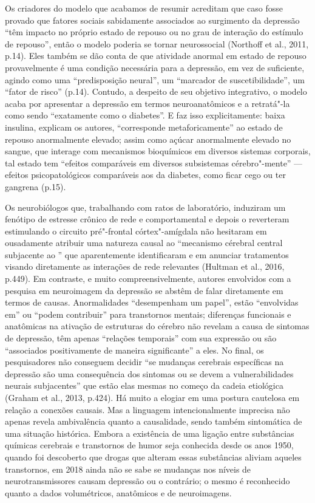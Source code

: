 Os criadores do modelo que acabamos de resumir acreditam que caso fosse
provado que fatores sociais sabidamente associados ao surgimento da
depressão ``têm impacto no próprio estado de repouso ou no grau de
interação do estímulo de repouso'', então o modelo poderia se tornar
neurossocial (Northoff et al., 2011, p.14). Eles também se dão conta de
que atividade anormal em estado de repouso provavelmente é uma condição
necessária para a depressão, em vez de suficiente, agindo como uma
``predisposição neural'', um ``marcador de suscetibilidade'', um ``fator
de risco'' (p.14). Contudo, a despeito de seu objetivo integrativo, o
modelo acaba por apresentar a depressão em termos neuroanatômicos e a
retratá"-la como sendo ``exatamente como o diabetes''. E faz isso
explicitamente: baixa insulina, explicam os autores, ``corresponde
metaforicamente'' ao estado de repouso anormalmente elevado; assim como
açúcar anormalmente elevado no sangue, que interage com mecanismos
bioquímicos em diversos sistemas corporais, tal estado tem ``efeitos
comparáveis em diversos subsistemas cérebro"-mente'' --- efeitos
psicopatológicos comparáveis aos da diabetes, como ficar cego ou ter
gangrena (p.15).

Os neurobiólogos que, trabalhando com ratos de laboratório, induziram um
fenótipo de estresse crônico de rede e comportamental e depois o
reverteram estimulando o circuito pré"-frontal córtex"-amígdala não
hesitaram em ousadamente atribuir uma natureza causal ao ``mecanismo
cérebral central subjacente ao '' que aparentemente identificaram e
em anunciar tratamentos visando diretamente as interações de rede
relevantes (Hultman et al., 2016, p.449). Em contraste, e muito
compreensivelmente, autores envolvidos com a pesquisa em neuroimagem da
depressão se abstêm de falar diretamente em termos de causas.
Anormalidades ``desempenham um papel'', estão ``envolvidas em'' ou
``podem contribuir'' para transtornos mentais; diferenças funcionais e
anatômicas na ativação de estruturas do cérebro não revelam a causa de
sintomas de depressão, têm apenas ``relações temporais'' com sua
expressão ou são ``associados positivamente de maneira significante'' a
eles. No final, os pesquisadores não conseguem decidir ``se mudanças
cerebrais específicas na depressão são uma consequência dos sintomas ou
se devem a vulnerabilidades neurais subjacentes'' que estão elas mesmas
no começo da cadeia etiológica (Graham et al., 2013, p.424). Há muito a
elogiar em uma postura cautelosa em relação a conexões causais. Mas a
linguagem intencionalmente imprecisa não apenas revela ambivalência
quanto a causalidade, sendo também sintomática de uma situação
histórica. Embora a existência de uma ligação entre substâncias químicas
cerebrais e transtornos de humor seja conhecida desde os anos 1950,
quando foi descoberto que drogas que alteram essas substâncias aliviam
aqueles transtornos, em 2018 ainda não se sabe se mudanças nos níveis de
neurotransmissores causam depressão ou o contrário; o mesmo é
reconhecido quanto a dados volumétricos, anatômicos e de neuroimagens.

